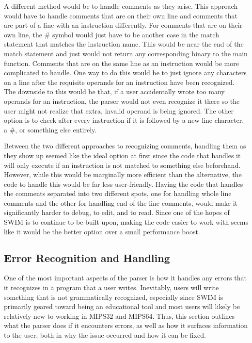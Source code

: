 \documentclass[
    parskip=half,
    fontsize=12pt,
    titlepage=firstiscover,
    toc=bibliography,
    numbers=endperiod
]{scrartcl}
\begin{document}
A different method would be to handle comments as they arise. This
approach would have to handle comments that are on their own line and
comments that are part of a line with an instruction differently. For
comments that are on their own line, the \# symbol would just have to be
another case in the match statement that matches the instruction name.
This would be near the end of the match statement and just would not
return any corresponding binary to the main function. Comments that are
on the same line as an instruction would be more complicated to handle.
One way to do this would be to just ignore any characters on a line
after the requisite operands for an instruction have been recognized.
The downside to this would be that, if a user accidentally wrote too
many operands for an instruction, the parser would not even recognize it
there so the user might not realize that extra, invalid operand is being
ignored. The other option is to check after every instruction if it is
followed by a new line character, a \#, or something else entirely.

Between the two different approaches to recognizing comments, handling
them as they show up seemed like the ideal option at first since the
code that handles it will only execute if an instruction is not matched
to something else beforehand. However, while this would be marginally
more efficient than the alternative, the code to handle this would be
far less user-friendly. Having the code that handles the comments
separated into two different spots, one for handling whole line comments
and the other for handling end of the line comments, would make it
significantly harder to debug, to edit, and to read. Since one of the
hopes of SWIM is to continue to be built upon, making the code easier to
work with seems like it would be the better option over a small
performance boost.

\subsection{Error Recognition and Handling}

One of the most important aspects of the parser is how it handles any
errors that it recognizes in a program that a user writes. Inevitably,
users will write something that is not grammatically recognized,
especially since SWIM is primarily geared toward being an educational
tool and most users will likely be relatively new to working in MIPS32
and MIPS64. Thus, this section outlines what the parser does if it
encounters errors, as well as how it surfaces information to the user,
both in why the issue occurred and how it can be fixed.
\end{document}
